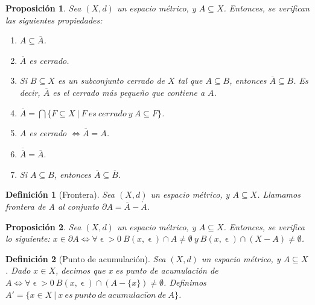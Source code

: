 \documentclass[11pt, a4paper, titlepage]{article}
\let\epsilon\upvarepsilon
\theoremstyle{theorem-style}
\newtheorem*{nprop}{Proposición}
\theoremstyle{definition-style}
\newtheorem*{ndef}{Definición}
\theoremstyle{remark-style}
\theoremstyle{example-style}
\newenvironment{nlist}
{\begin{enumerate}
\renewcommand\labelenumi{(\emph{\roman{enumi})}}}
{\end{enumerate}}
\begin{document}
\begin{nprop}
Sea $(X,d)$ un espacio métrico, y $A\subseteq X$. Entonces, se verifican las siguientes propiedades:
\begin{nlist}
\item $A \subseteq \overline{A}$.

\item $\overline{A}$ es cerrado.

\item Si $B\subseteq X$ es un subconjunto cerrado de $X$ tal que $A\subseteq B$, entonces $\overline{A} \subseteq B$. Es decir, $\overline{A}$ es el cerrado más pequeño que contiene a $A$.

\item $\displaystyle \overline{A}  = \bigcap \{ F\subseteq X \ | \ F\ es\ cerrado\ y\ A\subseteq F \}$.

\item $A$ es cerrado $\iff \overline{A} = A$.

\item $\overline{\overline{A}} = \overline{A}.$

\item Si $A\subseteq B$, entonces $\overline{A} \subseteq \overline{B}$.
\end{nlist}

\end{nprop}



\begin{ndef}[Frontera]
Sea $(X,d)$ un espacio métrico, y $A\subseteq X$. Llamamos \textit{frontera de A} al conjunto $\partial A = \overline{A}-\mathring{A}$.	
\end{ndef}



\begin{nprop}
Sea $(X,d)$ un espacio métrico, y $A\subseteq X$. Entonces, se verifica lo siguiente:
$x\in \partial A \iff \forall \epsilon > 0\ B(x,\epsilon)\cap A \neq \emptyset \ y\ B(x,\epsilon)\cap (X-A) \neq \emptyset$.
\end{nprop}



\begin{ndef}[Punto de acumulación]
Sea $(X,d)$ un espacio métrico, y $A\subseteq X$. Dado $x\in X$, decimos que \textit{x es punto de acumulación de} $A \iff \forall \epsilon > 0\ B(x,\epsilon)\cap (A-\{x\})\neq \emptyset$. Definimos $A' = \{ x\in X \ | \ x\ es\ punto\ de\ acumulaci\acute{o}n\ de\ A \}$.
\end{ndef}
\end{document}
